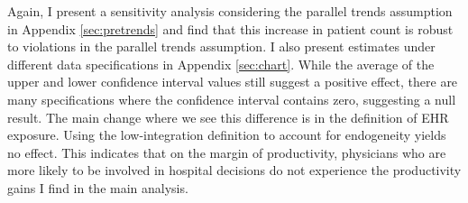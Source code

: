 \documentclass[12pt]{article}
\begin{document}
Again, I present a sensitivity analysis considering the parallel trends assumption in Appendix \ref{sec:pretrends} and find that this increase in patient count is robust to violations in the parallel trends assumption. I also present estimates under different data specifications in Appendix \ref{sec:chart}. While the average of the upper and lower confidence interval values still suggest a positive effect, there are many specifications where the confidence interval contains zero, suggesting a null result. The main change where we see this difference is in the definition of EHR exposure. Using the low-integration definition to account for endogeneity yields no effect. This indicates that on the margin of productivity, physicians who are more likely to be involved in hospital decisions do not experience the productivity gains I find in the main analysis. 
\end{document}
